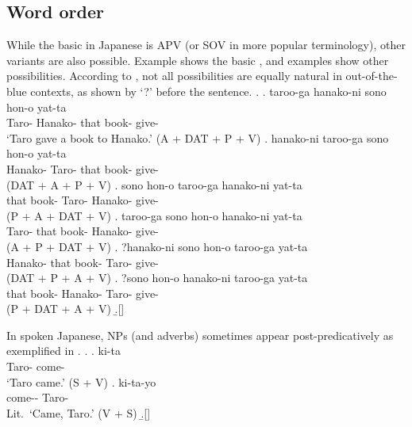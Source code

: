 \subsection{Word order}\label{BackSubSecWO}
\largerpage[2]
While the basic  in Japanese is APV (or SOV in more popular terminology),
other variants are also possible.
Example \Next[a] shows the basic , and
examples \Next[b--f] show other possibilities.
According to ,
not all possibilities are equally natural in out-of-the-blue contexts,
as shown by `?' before the sentence.
%
\ex.
 \ag. taroo-ga hanako-ni sono hon-o yat-ta \\
      Taro- Hanako- that book- give- \\
      `Taro gave a book to Hanako.' \hfill{(A + DAT + P + V)}
 \bg. hanako-ni taroo-ga sono hon-o yat-ta \\
      Hanako- Taro- that book- give- \\
      \hfill{(DAT + A + P + V)}
 \bg. sono hon-o taroo-ga hanako-ni yat-ta \\
      that book- Taro- Hanako- give- \\
      \hfill{(P + A + DAT + V)}
 \bg. taroo-ga sono hon-o hanako-ni yat-ta \\
      Taro- that book- Hanako- give- \\
      \hfill{(A + P + DAT + V)}
 \bg. ?hanako-ni sono hon-o taroo-ga yat-ta \\
      Hanako- that book- Taro- give- \\
      \hfill{(DAT + P + A + V)}
 \bg. ?sono hon-o hanako-ni taroo-ga yat-ta \\
      that book- Hanako-  Taro- give- \\
      \hfill{(P + DAT + A + V)}
 \b.[] \hfill{\cite[260]{shibatani90}}

 \clearpage
In spoken Japanese,
NPs (and adverbs) sometimes appear post-predicatively as exemplified in \Next[b].
%
\ex.
 \ag.  ki-ta \\
      Taro- come- \\
      `Taro came.' \hfill{(S + V)}
 \bg. ki-ta-yo  \\
      come-- Taro- \\
      Lit.~`Came, Taro.' \hfill{(V + S)}
 \b.[] \hfill{\cite[258--259]{shibatani90}}



